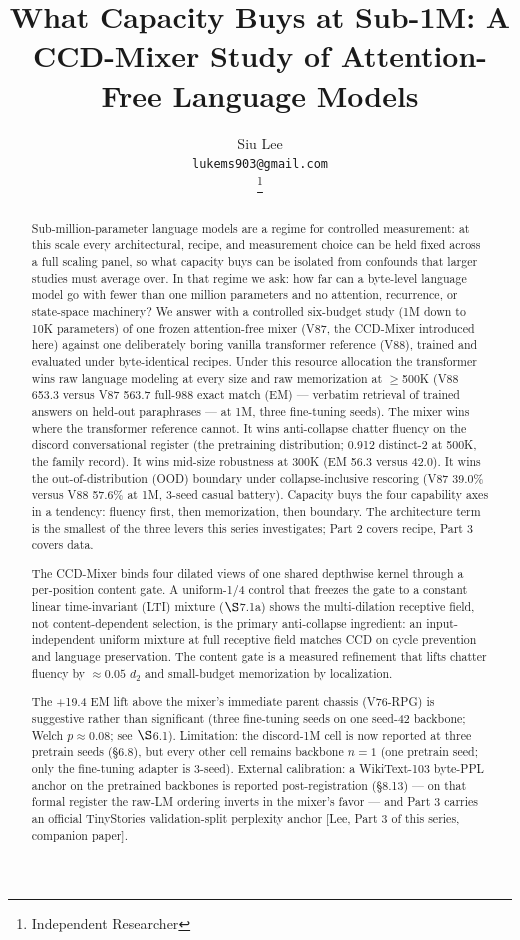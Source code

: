 \documentclass[11pt]{article}
\title{What Capacity Buys at Sub-1M: A CCD-Mixer Study of Attention-Free Language Models}
\author{Siu Lee \\ \texttt{lukems903@gmail.com} \\ \thanks{Independent Researcher}}
\date{}
\begin{document}
\maketitle

\begin{abstract}
Sub-million-parameter language models are a regime for controlled measurement: at this scale every architectural, recipe, and measurement choice can be held fixed across a full scaling panel, so what capacity buys can be isolated from confounds that larger studies must average over. In that regime we ask: how far can a byte-level language model go with fewer than one million parameters and no attention, recurrence, or state-space machinery? We answer with a controlled six-budget study (1M down to 10K parameters) of one frozen attention-free mixer (V87, the CCD-Mixer introduced here) against one deliberately boring vanilla transformer reference (V88), trained and evaluated under byte-identical recipes. Under this resource allocation the transformer wins raw language modeling at every size and raw memorization at $\geq$500K (V88 653.3 versus V87 563.7 full-988 exact match (EM) --- verbatim retrieval of trained answers on held-out paraphrases --- at 1M, three fine-tuning seeds). The mixer wins where the transformer reference cannot. It wins anti-collapse chatter fluency on the discord conversational register (the pretraining distribution; 0.912 distinct-2 at 500K, the family record). It wins mid-size robustness at 300K (EM 56.3 versus 42.0). It wins the out-of-distribution (OOD) boundary under collapse-inclusive rescoring (V87 39.0\% versus V88 57.6\% at 1M, 3-seed casual battery). Capacity buys the four capability axes in a tendency: fluency first, then memorization, then boundary. The architecture term is the smallest of the three levers this series investigates; Part 2 covers recipe, Part 3 covers data.

The CCD-Mixer binds four dilated views of one shared depthwise kernel through a per-position content gate. A uniform-1/4 control that freezes the gate to a constant linear time-invariant (LTI) mixture ($\S$7.1a) shows the multi-dilation receptive field, not content-dependent selection, is the primary anti-collapse ingredient: an input-independent uniform mixture at full receptive field matches CCD on cycle prevention and language preservation. The content gate is a measured refinement that lifts chatter fluency by $\approx 0.05$ $d_2$ and small-budget memorization by localization.

The +19.4 EM lift above the mixer's immediate parent chassis (V76-RPG) is suggestive rather than significant (three fine-tuning seeds on one seed-42 backbone; Welch $p \approx 0.08$; see $\S$6.1). Limitation: the discord-1M cell is now reported at three pretrain seeds (\S6.8), but every other cell remains backbone $n = 1$ (one pretrain seed; only the fine-tuning adapter is 3-seed). External calibration: a WikiText-103 byte-PPL anchor on the pretrained backbones is reported post-registration (\S8.13) --- on that formal register the raw-LM ordering inverts in the mixer's favor --- and Part 3 carries an official TinyStories validation-split perplexity anchor [Lee, Part 3 of this series, companion paper].
\end{abstract}
\end{document}

